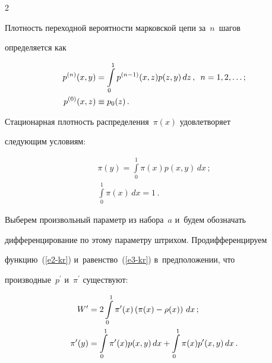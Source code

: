 \begin{multicols}{2}
  


  Плотность переходной ве\-ро\-ят\-ности марковской цепи за~$n$~шагов 


определяется как


  \begin{align*}


  p^{(n)}(x,y)&=\int\limits_0^1 p^{(n-1)}(x,z) p(z,y)\,dz\,,\enskip


  n=1,2,\ldots;\\


  p^{(0)}(x,z)&\equiv p_0(z)\,.


  \end{align*}


  


  Стационарная плот\-ность распределения~$\pi(x)$ удовлетворяет 


сле\-ду\-ющим условиям:


  \begin{gather}


  \pi(y) = \int\limits_0^1 \pi(x) p(x,y)\,dx\,;\label{e3-kr}\\


  \int\limits_0^1\pi(x)\,dx=1\,.\label{e4-kr}


  \end{gather}


  


  Выберем произвольный параметр из набора~$a$ и~будем обозначать 


дифференцирование по этому па\-ра\-мет\-ру штри\-хом. Продифференцируем 


функцию~(\ref{e2-kr}) и~равенство~(\ref{e3-kr}) в~предположении, что 


производные~$p^\prime$ и~$\pi^\prime$ существуют:


  \begin{align}


  W^\prime &= 2\int\limits_0^1 \pi^\prime(x) \left( \pi(x)-


\rho(x)\right)\,dx\,;\notag %


\\


  \pi^\prime(y)&= \int\limits_0^1 \pi^\prime(x) p(x,y)\,dx +\int\limits_0^1 \pi(x) 


p^\prime(x,y)\,dx\,.\label{e6-kr}


  \end{align}



\end{multicols}
